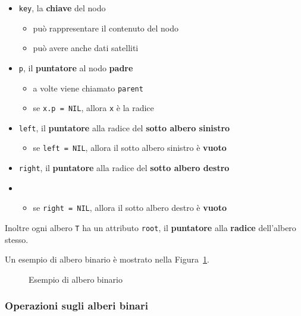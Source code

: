 \documentclass[italian, 10pt]{article}
\begin{document}
\begin{itemize}
  \item \texttt{key}, la \textbf{chiave} del nodo
        \begin{itemize}
          \item può rappresentare il contenuto del nodo
          \item può avere anche dati satelliti
        \end{itemize}
  \item \texttt{p}, il \textbf{puntatore} al nodo \textbf{padre}
        \begin{itemize}
          \item a volte viene chiamato \texttt{parent}
          \item se \texttt{x.p = NIL}, allora \texttt{x} è la radice
        \end{itemize}
  \item \texttt{left}, il \textbf{puntatore} alla radice del \textbf{sotto albero sinistro}
        \begin{itemize}[label=\(\rightarrow\)]
          \item se \texttt{left = NIL}, allora il sotto albero sinistro è \textbf{vuoto}
        \end{itemize}
  \item \texttt{right}, il \textbf{puntatore} alla radice del \textbf{sotto albero destro}
  \item   \begin{itemize}[label=\(\rightarrow\)]
          \item se \texttt{right = NIL}, allora il sotto albero destro è \textbf{vuoto}
        \end{itemize}
\end{itemize}

Inoltre ogni albero \texttt{T} ha un attributo \texttt{root}, il \textbf{puntatore} alla \textbf{radice} dell'albero stesso.

\bigskip
Un esempio di albero binario è mostrato nella Figura~\ref{fig:esempio-albero-binario}.

\begin{figure}[htbp]
  \bigskip
  \centering
  \caption{Esempio di albero binario}
  \label{fig:esempio-albero-binario}
  \bigskip
\end{figure}

\subsubsection{Operazioni sugli alberi binari}
\end{document}
